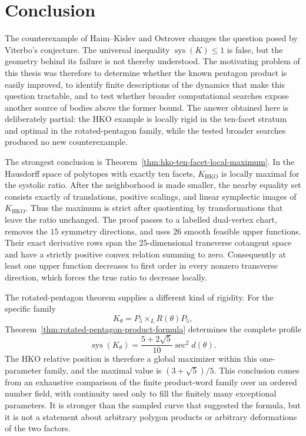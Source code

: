 \section{Conclusion}\label{sec:conclusion}

The counterexample of Haim--Kislev and Ostrover changes the question posed by
Viterbo's conjecture.  The universal inequality
\(\operatorname{sys}(K)\leq1\) is false, but the geometry behind its failure
is not thereby understood.  The motivating problem of this thesis was
therefore to determine whether the known pentagon product is easily improved,
to identify finite descriptions of the dynamics that make this question
tractable, and to test whether broader computational searches expose another
source of bodies above the former bound.  The answer obtained here is
deliberately partial: the HKO example is locally rigid in the ten-facet
stratum and optimal in the rotated-pentagon family, while the tested broader
searches produced no new counterexample.

The strongest conclusion is
Theorem~\ref{thm:hko-ten-facet-local-maximum}.  In the Hausdorff space of
polytopes with exactly ten facets, \(K_{\mathrm{HKO}}\) is locally maximal for
the systolic ratio.  After the neighborhood is made smaller, the nearby
equality set consists exactly of translations, positive scalings, and linear
symplectic images of \(K_{\mathrm{HKO}}\).  Thus the maximum is strict after
quotienting by transformations that leave the ratio unchanged.  The proof
passes to a labelled dual-vertex chart, removes the \(15\) symmetry
directions, and uses \(26\) smooth feasible upper functions.  Their exact
derivative rows span the \(25\)-dimensional transverse cotangent space and
have a strictly positive convex relation summing to zero.  Consequently at
least one upper function decreases to first order in every nonzero transverse
direction, which forces the true ratio to decrease locally.

The rotated-pentagon theorem supplies a different kind of rigidity.  For the
specific family
\[
  K_\theta=P_5\times_LR(\theta)P_5,
\]
Theorem~\ref{thm:rotated-pentagon-product-formula} determines the complete
profile
\[
  \operatorname{sys}(K_\theta)
  =\frac{5+2\sqrt5}{10}\sec^2 d(\theta).
\]
The HKO relative position is therefore a global maximizer within this
one-parameter family, and the maximal value is
\((3+\sqrt5)/5\).  This conclusion comes from an exhaustive comparison of the
finite product-word family over an ordered number field, with continuity used
only to fill the finitely many exceptional parameters.  It is stronger than
the sampled curve that suggested the formula, but it is not a statement about
arbitrary polygon products or arbitrary deformations of the two factors.

